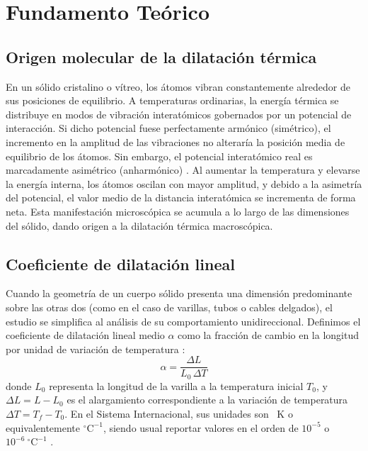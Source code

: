 
\section{Fundamento Teórico}

\subsection{Origen molecular de la dilatación térmica}

En un sólido cristalino o vítreo, los átomos vibran constantemente alrededor de sus posiciones de equilibrio. A temperaturas ordinarias, la energía térmica se distribuye en modos de vibración interatómicos gobernados por un potencial de interacción. Si dicho potencial fuese perfectamente armónico (simétrico), el incremento en la amplitud de las vibraciones no alteraría la posición media de equilibrio de los átomos. Sin embargo, el potencial interatómico real es marcadamente asimétrico (anharmónico) \cite{serway}. Al aumentar la temperatura y elevarse la energía interna, los átomos oscilan con mayor amplitud, y debido a la asimetría del potencial, el valor medio de la distancia interatómica se incrementa de forma neta. Esta manifestación microscópica se acumula a lo largo de las dimensiones del sólido, dando origen a la dilatación térmica macroscópica.

\subsection{Coeficiente de dilatación lineal}

Cuando la geometría de un cuerpo sólido presenta una dimensión predominante sobre las otras dos (como en el caso de varillas, tubos o cables delgados), el estudio se simplifica al análisis de su comportamiento unidireccional. Definimos el coeficiente de dilatación lineal medio $\alpha$ como la fracción de cambio en la longitud por unidad de variación de temperatura \cite{halliday}:
\begin{equation}
    \alpha = \frac{\Delta L}{L_0\,\Delta T}
    \label{eq:def_alfa}
\end{equation}
donde $L_0$ representa la longitud de la varilla a la temperatura inicial $T_0$, y $\Delta L = L - L_0$ es el alargamiento correspondiente a la variación de temperatura $\Delta T = T_f - T_0$. En el Sistema Internacional, sus unidades son \unit{\per\kelvin} o equivalentemente $^\circ\text{C}^{-1}$, siendo usual reportar valores en el orden de $10^{-5}$ o $10^{-6}\ ^\circ\text{C}^{-1}$ \cite{serway}.

